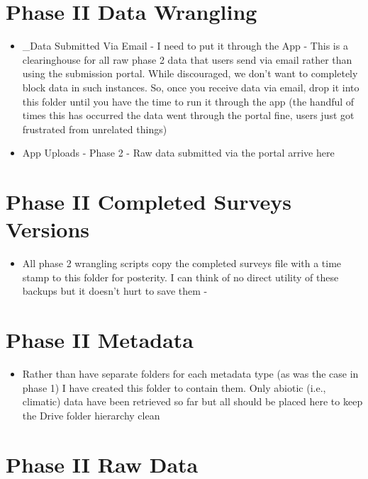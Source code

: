 \documentclass[
  letterpaper,
  DIV=11,
  numbers=noendperiod]{scrreprt}
\providecommand{\tightlist}{%
  \setlength{\itemsep}{0pt}\setlength{\parskip}{0pt}}\usepackage{longtable,booktabs,array}
\begin{document}
\section{Phase II Data Wrangling}\label{phase-ii-data-wrangling}

\begin{itemize}
\item
  \_Data Submitted Via Email - I need to put it through the App - This
  is a clearinghouse for all raw phase 2 data that users send via email
  rather than using the submission portal. While discouraged, we don't
  want to completely block data in such instances. So, once you receive
  data via email, drop it into this folder until you have the time to
  run it through the app (the handful of times this has occurred the
  data went through the portal fine, users just got frustrated from
  unrelated things)
\item
  App Uploads - Phase 2 - Raw data submitted via the portal arrive here
\end{itemize}

\section{Phase II Completed Surveys
Versions}\label{phase-ii-completed-surveys-versions}

\begin{itemize}
\tightlist
\item
  All phase 2 wrangling scripts copy the completed surveys file with a
  time stamp to this folder for posterity. I can think of no direct
  utility of these backups but it doesn't hurt to save them -
\end{itemize}

\section{Phase II Metadata}\label{phase-ii-metadata}

\begin{itemize}
\tightlist
\item
  Rather than have separate folders for each metadata type (as was the
  case in phase 1) I have created this folder to contain them. Only
  abiotic (i.e., climatic) data have been retrieved so far but all
  should be placed here to keep the Drive folder hierarchy clean
\end{itemize}

\section{Phase II Raw Data}\label{phase-ii-raw-data}
\end{document}

